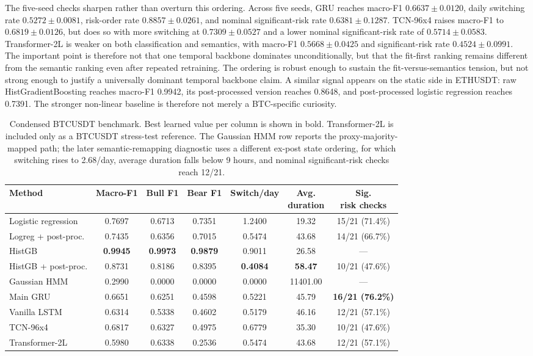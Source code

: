 \documentclass[a4paper,fleqn]{cas-dc}
\begin{document}
The five-seed checks sharpen rather than overturn this ordering. Across five seeds, GRU reaches macro-F1 $0.6637 \pm 0.0120$, daily switching rate $0.5272 \pm 0.0081$, risk-order rate $0.8857 \pm 0.0261$, and nominal significant-risk rate $0.6381 \pm 0.1287$. TCN-96x4 raises macro-F1 to $0.6819 \pm 0.0126$, but does so with more switching at $0.7309 \pm 0.0527$ and a lower nominal significant-risk rate of $0.5714 \pm 0.0583$. Transformer-2L is weaker on both classification and semantics, with macro-F1 $0.5668 \pm 0.0425$ and significant-risk rate $0.4524 \pm 0.0991$. The important point is therefore not that one temporal backbone dominates unconditionally, but that the fit-first ranking remains different from the semantic ranking even after repeated retraining. The ordering is robust enough to sustain the fit-versus-semantics tension, but not strong enough to justify a universally dominant temporal backbone claim. A similar signal appears on the static side in ETHUSDT: raw HistGradientBoosting reaches macro-F1 0.9942, its post-processed version reaches 0.8648, and post-processed logistic regression reaches 0.7391. The stronger non-linear baseline is therefore not merely a BTC-specific curiosity.

\begin{table}[t]
\caption{Condensed BTCUSDT benchmark. Best learned value per column is shown in bold. Transformer-2L is included only as a BTCUSDT stress-test reference. The Gaussian HMM row reports the proxy-majority-mapped path; the later semantic-remapping diagnostic uses a different ex-post state ordering, for which switching rises to 2.68/day, average duration falls below 9 hours, and nominal significant-risk checks reach 12/21.}
\label{tab:btc-compact}
\centering
\scriptsize
\setlength{\tabcolsep}{3.4pt}
\begin{tabular}{lcccccc}
\toprule
Method & Macro-F1 & Bull F1 & Bear F1 & Switch/day & \shortstack{Avg.\\duration} & \shortstack{Sig.\\risk checks} \\
\midrule
Logistic regression & 0.7697 & 0.6713 & 0.7351 & 1.2400 & 19.32 & 15/21 (71.4\%) \\
Logreg + post-proc. & 0.7435 & 0.6356 & 0.7015 & 0.5474 & 43.68 & 14/21 (66.7\%) \\
HistGB & \textbf{0.9945} & \textbf{0.9973} & \textbf{0.9879} & 0.9011 & 26.58 & --- \\
HistGB + post-proc. & 0.8731 & 0.8186 & 0.8395 & \textbf{0.4084} & \textbf{58.47} & 10/21 (47.6\%) \\
Gaussian HMM & 0.2990 & 0.0000 & 0.0000 & 0.0000 & 11401.00 & --- \\
Main GRU & 0.6651 & 0.6251 & 0.4598 & 0.5221 & 45.79 & \textbf{16/21 (76.2\%)} \\
Vanilla LSTM & 0.6314 & 0.5338 & 0.4602 & 0.5179 & 46.16 & 12/21 (57.1\%) \\
TCN-96x4 & 0.6817 & 0.6327 & 0.4975 & 0.6779 & 35.30 & 10/21 (47.6\%) \\
Transformer-2L & 0.5980 & 0.6338 & 0.2536 & 0.5474 & 43.68 & 12/21 (57.1\%) \\
\bottomrule
\end{tabular}
\end{table}
\end{document}
